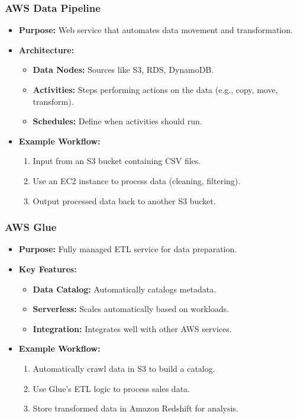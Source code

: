 \documentclass[aspectratio=169]{beamer}
\begin{document}
\begin{frame}
    \frametitle{AWS Data Pipeline}
    \begin{itemize}
        \item \textbf{Purpose:} Web service that automates data movement and transformation.
        \item \textbf{Architecture:}
        \begin{itemize}
            \item \textbf{Data Nodes:} Sources like S3, RDS, DynamoDB.
            \item \textbf{Activities:} Steps performing actions on the data (e.g., copy, move, transform).
            \item \textbf{Schedules:} Define when activities should run.
        \end{itemize}
        \item \textbf{Example Workflow:}
        \begin{enumerate}
            \item Input from an S3 bucket containing CSV files.
            \item Use an EC2 instance to process data (cleaning, filtering).
            \item Output processed data back to another S3 bucket.
        \end{enumerate}
    \end{itemize}
\end{frame}

\begin{frame}
    \frametitle{AWS Glue}
    \begin{itemize}
        \item \textbf{Purpose:} Fully managed ETL service for data preparation.
        \item \textbf{Key Features:}
        \begin{itemize}
            \item \textbf{Data Catalog:} Automatically catalogs metadata.
            \item \textbf{Serverless:} Scales automatically based on workloads.
            \item \textbf{Integration:} Integrates well with other AWS services.
        \end{itemize}
        \item \textbf{Example Workflow:}
        \begin{enumerate}
            \item Automatically crawl data in S3 to build a catalog.
            \item Use Glue’s ETL logic to process sales data.
            \item Store transformed data in Amazon Redshift for analysis.
        \end{enumerate}
    \end{itemize}
\end{frame}
\end{document}
